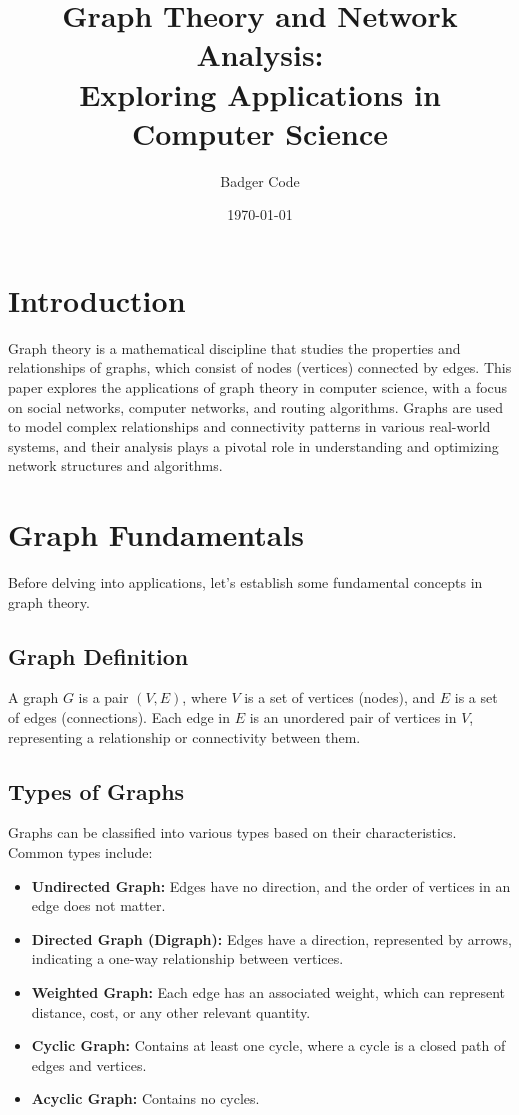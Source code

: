 \documentclass{article}
\title{Graph Theory and Network Analysis: \\
       Exploring Applications in Computer Science}
\author{Badger Code}
\date{\today}
\begin{document}
\maketitle

\section{Introduction}
Graph theory is a mathematical discipline that studies the properties and relationships of graphs, which consist of nodes (vertices) connected by edges. This paper explores the applications of graph theory in computer science, with a focus on social networks, computer networks, and routing algorithms. Graphs are used to model complex relationships and connectivity patterns in various real-world systems, and their analysis plays a pivotal role in understanding and optimizing network structures and algorithms.

\section{Graph Fundamentals}
Before delving into applications, let's establish some fundamental concepts in graph theory.

\subsection{Graph Definition}
A graph $G$ is a pair $(V, E)$, where $V$ is a set of vertices (nodes), and $E$ is a set of edges (connections). Each edge in $E$ is an unordered pair of vertices in $V$, representing a relationship or connectivity between them.

\subsection{Types of Graphs}
Graphs can be classified into various types based on their characteristics. Common types include:
\begin{itemize}
    \item \textbf{Undirected Graph:} Edges have no direction, and the order of vertices in an edge does not matter.
    \item \textbf{Directed Graph (Digraph):} Edges have a direction, represented by arrows, indicating a one-way relationship between vertices.
    \item \textbf{Weighted Graph:} Each edge has an associated weight, which can represent distance, cost, or any other relevant quantity.
    \item \textbf{Cyclic Graph:} Contains at least one cycle, where a cycle is a closed path of edges and vertices.
    \item \textbf{Acyclic Graph:} Contains no cycles.
\end{itemize}
\end{document}
